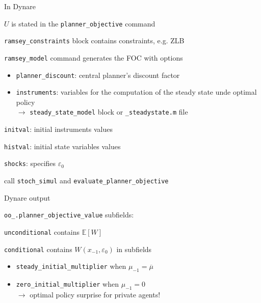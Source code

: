\documentclass[handout,usepdftitle=false,xcolor=dvipsnames,aspectratio=169]{beamer}
\begin{document}
\begin{frame}{In Dynare}
  \begin{witemize}
    \item $U$ is stated in the \texttt{planner\_objective} command
    \item \texttt{ramsey\_constraints} block contains constraints, e.g. ZLB
    \item \texttt{ramsey\_model} command generates the FOC with options
          \begin{itemize}
            \item \texttt{planner\_discount}: central planner's discount factor
            \item \texttt{instruments}: variables for the computation of the steady state unde optimal policy\\
                  $\rightarrow$ \texttt{steady\_state\_model} block or \texttt{\_steadystate.m} file
          \end{itemize}
    \item \texttt{initval}: initial instruments values
    \item \texttt{histval}: initial state variables values
    \item \texttt{shocks}: specifies $\varepsilon_0$
    \item call \texttt{stoch\_simul} and \texttt{evaluate\_planner\_objective}
  \end{witemize}
\end{frame}


\begin{frame}{Dynare output}
  \begin{witemize}
    \item \texttt{oo\_.planner\_objective\_value} subfields:
          \begin{witemize}
            \item \texttt{unconditional} contains $\mathbb{E} [W]$
            \item \texttt{conditional} contains $W \left( x_{-1}, \varepsilon_0 \right)$ in subfields
                  \begin{itemize}
                    \item \texttt{steady\_initial\_multiplier} when $\mu_{-1} = \overline{\mu}$
                    \item \texttt{zero\_initial\_multiplier} when $\mu_{-1} = 0$\\
                          $\rightarrow$ optimal policy surprise for private agents!
                  \end{itemize}
          \end{witemize}
  \end{witemize}
\end{frame}
\end{document}
